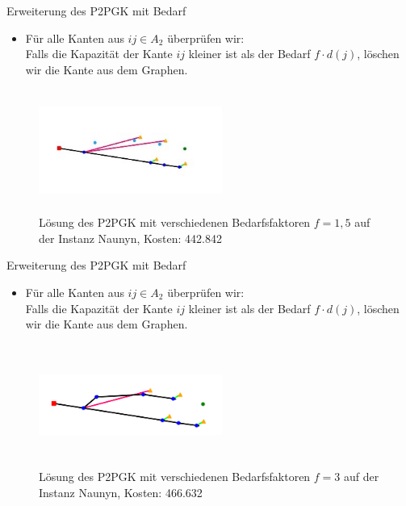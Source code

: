 \documentclass{beamer}
\begin{document}
		\begin{frame}{Erweiterung des P2PGK mit Bedarf}
			\begin{itemize}
				\item F\"ur alle Kanten aus $ij \in A_2$ \"uberpr\"ufen wir:\\
				Falls die Kapazit\"at der Kante $ij$ kleiner ist als der Bedarf  $f \cdot d(j)$,
				l\"oschen wir die Kante aus dem Graphen.
			\end{itemize}
			\begin{figure}[h]
				\centering
				\includegraphics[height=4cm, width=6cm]{./Bilder/P2PGK_Naunyn_demand1_5_duration0_2}
				\caption{Lösung des P2PGK mit verschiedenen Bedarfsfaktoren $f = 1,5$ auf der Instanz Naunyn, Kosten: 442.842}
			\end{figure}
		\end{frame}
		
		\begin{frame}{Erweiterung des P2PGK mit Bedarf}
			\begin{itemize}
				\item F\"ur alle Kanten aus $ij \in A_2$ \"uberpr\"ufen wir:\\
				Falls die Kapazit\"at der Kante $ij$ kleiner ist als der Bedarf  $f \cdot d(j)$,
				l\"oschen wir die Kante aus dem Graphen.
			\end{itemize}
			\begin{figure}[h]
				\centering
				\includegraphics[height=4cm, width=6cm]{./Bilder/P2PGK_Naunyn_demand3_5_duration0}
				\caption{Lösung des P2PGK mit verschiedenen Bedarfsfaktoren $f = 3$ auf der Instanz Naunyn, Kosten: 466.632}
			\end{figure}
		\end{frame}
\end{document}
